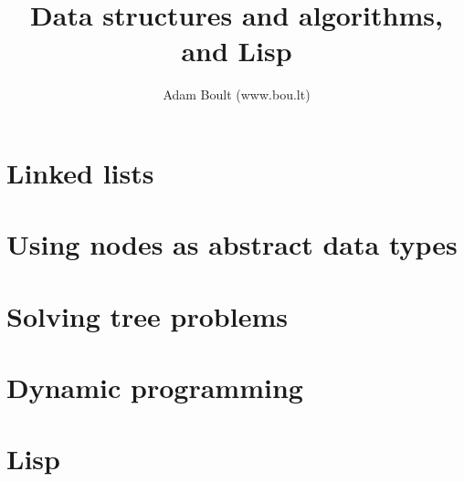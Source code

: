 \documentclass[oneside]{book}
\begin{document}
\author{Adam Boult (www.bou.lt)}
\title{Data structures and algorithms, and Lisp}
\maketitle

\setcounter{tocdepth}{0}
\tableofcontents



\part{Linked lists}



\part{Using nodes as abstract data types}



\part{Solving tree problems}







\part{Dynamic programming}




\part{Lisp}




\end{document}
